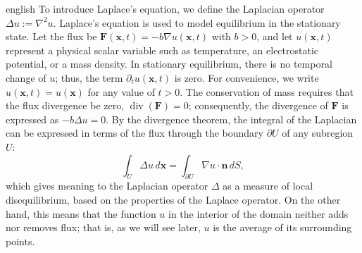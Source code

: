 \documentclass[0000.tex]{subfiles}
\begin{document}
\begin{hyphenrules}{english}
To introduce Laplace's equation, we define the Laplacian operator $\Delta u:=\nabla^2u$. Laplace's
equation is used to model equilibrium in the stationary state. Let
the flux be $\mathbf{F}(\mathbf{x},t)=-b\nabla u(\mathbf{x},t)$ with $b>0$, and let $u(\mathbf{x},t)$ represent a physical scalar
variable such as temperature, an electrostatic potential, or a mass density. In stationary equilibrium,
there is no temporal change of $u$; thus, the term $\partial_t u(\mathbf{x},t)$ is zero. For convenience, we
write $u(\mathbf{x},t)=u(\mathbf{x})$ for any value of $t>0$.
The conservation of mass requires that the flux divergence be zero, $\operatorname{div}(\mathbf{F})=0$;
consequently, the divergence of $\mathbf{F}$ is expressed as $-b\Delta u=0$. By the divergence theorem, the
integral of the Laplacian can be expressed in terms of the flux through the boundary $\partial U$ of any
subregion $U$:
\begin{equation}
  \int_U\Delta u\,d\mathbf{x}=\int_{\partial U}\nabla u\cdot\mathbf{n}\,d S,
  \label{eq:laplace-flux}
\end{equation}
which gives meaning to the Laplacian operator $\Delta$ as a measure of local disequilibrium, based on the properties of the Laplace operator. On the other hand, this means that the function $u$ in the interior of the domain neither adds nor removes flux;
that is, as we will see later, $u$ is the average of its surrounding points.


\end{hyphenrules}
\end{document}
